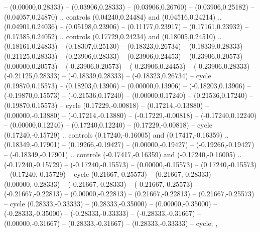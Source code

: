 {{-- (0.00000,0.28333)
-- (0.03906,0.28333)
-- (0.03906,0.26760)
-- (0.03906,0.25182)
-- (0.04057,0.24870)
.. controls (0.04240,0.24484) and (0.04516,0.24214) .. (0.04901,0.24036)
-- (0.05198,0.23906)
-- (0.11177,0.23917)
-- (0.17161,0.23932)
-- (0.17385,0.24052)
.. controls (0.17729,0.24234) and (0.18005,0.24510) .. (0.18161,0.24833)
-- (0.18307,0.25130)
-- (0.18323,0.26734)
-- (0.18339,0.28333)
-- (0.21125,0.28333)
-- (0.23906,0.28333)
-- (0.23906,0.24453)
-- (0.23906,0.20573)
-- (0.00000,0.20573)
-- (-0.23906,0.20573)
-- (-0.23906,0.24453)
-- (-0.23906,0.28333)
-- (-0.21125,0.28333)
-- (-0.18339,0.28333)
-- (-0.18323,0.26734)
-- cycle
(0.19870,0.15573)
-- (0.18203,0.13906)
-- (0.00000,0.13906)
-- (-0.18203,0.13906)
-- (-0.19870,0.15573)
-- (-0.21536,0.17240)
-- (0.00000,0.17240)
-- (0.21536,0.17240)
-- (0.19870,0.15573)
-- cycle
(0.17229,-0.00818)
-- (0.17214,-0.13880)
-- (0.00000,-0.13880)
-- (-0.17214,-0.13880)
-- (-0.17229,-0.00818)
-- (-0.17240,0.12240)
-- (0.00000,0.12240)
-- (0.17240,0.12240)
-- (0.17229,-0.00818)
-- cycle
(0.17240,-0.15729)
.. controls (0.17240,-0.16005) and (0.17417,-0.16359) .. (0.18349,-0.17901)
-- (0.19266,-0.19427)
-- (0.00000,-0.19427)
-- (-0.19266,-0.19427)
-- (-0.18349,-0.17901)
.. controls (-0.17417,-0.16359) and (-0.17240,-0.16005) .. (-0.17240,-0.15729)
-- (-0.17240,-0.15573)
-- (0.00000,-0.15573)
-- (0.17240,-0.15573)
-- (0.17240,-0.15729)
-- cycle
(0.21667,-0.25573)
-- (0.21667,-0.28333)
-- (0.00000,-0.28333)
-- (-0.21667,-0.28333)
-- (-0.21667,-0.25573)
-- (-0.21667,-0.22813)
-- (0.00000,-0.22813)
-- (0.21667,-0.22813)
-- (0.21667,-0.25573)
-- cycle
(0.28333,-0.33333)
-- (0.28333,-0.35000)
-- (0.00000,-0.35000)
-- (-0.28333,-0.35000)
-- (-0.28333,-0.33333)
-- (-0.28333,-0.31667)
-- (0.00000,-0.31667)
-- (0.28333,-0.31667)
-- (0.28333,-0.33333)
-- cycle;
},
}
\newcommand{\ChessPiece}[3]{%
  \begin{scope}[shift={(#2+0.5,#3+0.5)},x=9mm,y=9mm]
    \pic[transform shape] {vmsh chess #1};
  \end{scope}
}
